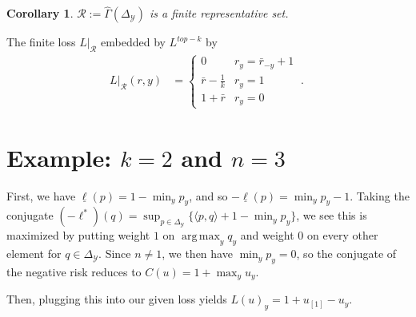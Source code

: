 \documentclass[12pt]{article}
\newcommand{\simplex}{\Delta_\Y}
\newcommand{\R}{\mathcal{R}}
\newcommand{\Y}{\mathcal{Y}}
\newcommand{\risk}[1]{\underline{#1}}
\newcommand{\inprod}[2]{\langle #1, #2 \rangle}%
\DeclareMathOperator*{\argmax}{arg\,max}
\newtheorem{corollary}{Corollary}
\begin{document}
\begin{corollary}
	$\R := \hat \Gamma(\simplex)$ is a finite representative set.
\end{corollary}

The finite loss $L|_{\R}$ embedded by $L^{top-k}$ by
\begin{align}
L|_{\R}(r,y) &= \begin{cases}
0 & r_y = \bar r_{-y} + 1\\
\bar r - \frac 1 k & r_y = 1\\
1 + \bar r & r_y = 0
\end{cases}~.~
\end{align}


\section{Example: $k=2$ and $n=3$}
First, we have $\risk{\ell}(p) = 1 - \min_y p_y$, and so $-\risk{\ell}(p) = \min_y p_y - 1$.
Taking the conjugate $(-\ell^*)(q) = \sup_{p \in \simplex} \{\inprod p q + 1 - \min_y p_y\}$, we see this is maximized by putting weight $1$ on $\argmax_y q_y$ and weight $0$ on every other element for $q \in \simplex$.
Since $n \neq 1$, we then have $\min_y p_y = 0$, so the conjugate of the negative risk reduces to $C(u) = 1 + \max_y u_y$.

Then, plugging this into our given loss yields $L(u)_y = 1 + u_{[1]} - u_y$.
\end{document}
